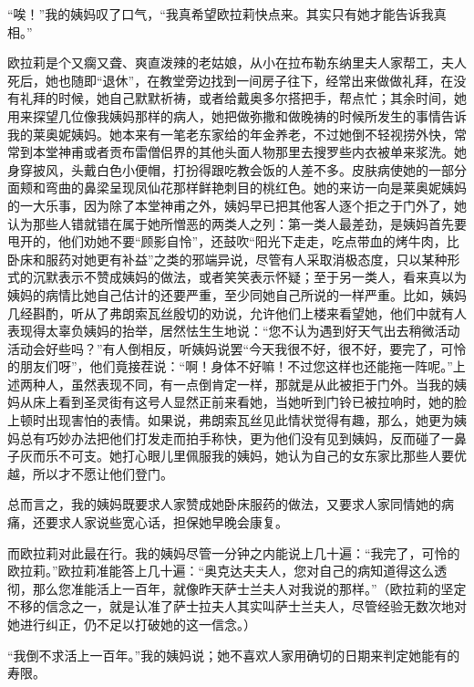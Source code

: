 \par “唉！”我的姨妈叹了口气，“我真希望欧拉莉快点来。其实只有她才能告诉我真相。”
\par 欧拉莉是个又瘸又聋、爽直泼辣的老姑娘，从小在拉布勒东纳里夫人家帮工，夫人死后，她也随即“退休”，在教堂旁边找到一间房子往下，经常出来做做礼拜，在没有礼拜的时候，她自己默默祈祷，或者给戴奥多尔搭把手，帮点忙；其余时间，她用来探望几位像我姨妈那样的病人，她把做弥撒和做晚祷的时候所发生的事情告诉我的莱奥妮姨妈。她本来有一笔老东家给的年金养老，不过她倒不轻视捞外快，常常到本堂神甫或者贡布雷僧侣界的其他头面人物那里去搜罗些内衣被单来浆洗。她身穿披风，头戴白色小便帽，打扮得跟吃教会饭的人差不多。皮肤病使她的一部分面颊和弯曲的鼻梁呈现凤仙花那样鲜艳刺目的桃红色。她的来访一向是莱奥妮姨妈的一大乐事，因为除了本堂神甫之外，姨妈早已把其他客人逐个拒之于门外了，她认为那些人错就错在属于她所憎恶的两类人之列：第一类人最差劲，是姨妈首先要甩开的，他们劝她不要“顾影自怜”，还鼓吹“阳光下走走，吃点带血的烤牛肉，比卧床和服药对她更有补益”之类的邪端异说，尽管有人采取消极态度，只以某种形式的沉默表示不赞成姨妈的做法，或者笑笑表示怀疑；至于另一类人，看来真以为姨妈的病情比她自己估计的还要严重，至少同她自己所说的一样严重。比如，姨妈几经斟酌，听从了弗朗索瓦丝殷切的劝说，允许他们上楼来看望她，他们中就有人表现得太辜负姨妈的抬举，居然怯生生地说：“您不认为遇到好天气出去稍微活动活动会好些吗？”有人倒相反，听姨妈说罢“今天我很不好，很不好，要完了，可怜的朋友们呀”，他们竟接茬说：“啊！身体不好嘛！不过您这样也还能拖一阵呢。”上述两种人，虽然表现不同，有一点倒肯定一样，那就是从此被拒于门外。当我的姨妈从床上看到圣灵街有这号人显然正前来看她，当她听到门铃已被拉响时，她的脸上顿时出现害怕的表情。如果说，弗朗索瓦丝见此情状觉得有趣，那么，她更为姨妈总有巧妙办法把他们打发走而拍手称快，更为他们没有见到姨妈，反而碰了一鼻子灰而乐不可支。她打心眼儿里佩服我的姨妈，她认为自己的女东家比那些人要优越，所以才不愿让他们登门。
\par 总而言之，我的姨妈既要求人家赞成她卧床服药的做法，又要求人家同情她的病痛，还要求人家说些宽心话，担保她早晚会康复。
\par 而欧拉莉对此最在行。我的姨妈尽管一分钟之内能说上几十遍：“我完了，可怜的欧拉莉。”欧拉莉准能答上几十遍：“奥克达夫夫人，您对自己的病知道得这么透彻，那么您准能活上一百年，就像昨天萨士兰夫人对我说的那样。”（欧拉莉的坚定不移的信念之一，就是认准了萨士拉夫人其实叫萨士兰夫人，尽管经验无数次地对她进行纠正，仍不足以打破她的这一信念。）
\par “我倒不求活上一百年。”我的姨妈说；她不喜欢人家用确切的日期来判定她能有的寿限。
